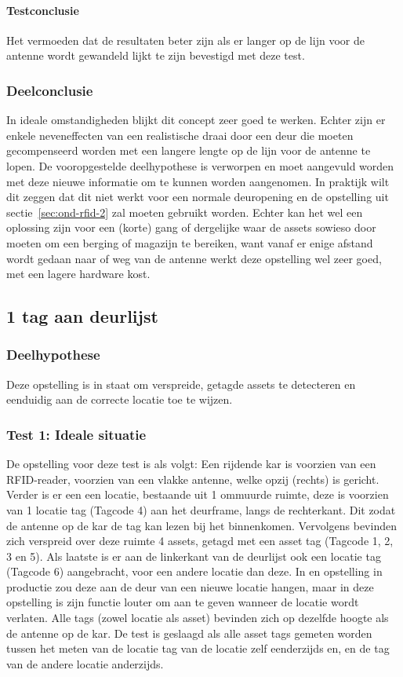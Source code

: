 \paragraph{Testconclusie}
Het vermoeden dat de resultaten beter zijn als er langer op de lijn voor de antenne wordt gewandeld lijkt te zijn bevestigd met deze test.

\subsubsection{Deelconclusie}
In ideale omstandigheden blijkt dit concept zeer goed te werken. Echter zijn er enkele neveneffecten van een realistische draai door een deur die moeten gecompenseerd worden met een langere lengte op de lijn voor de antenne te lopen. De vooropgestelde deelhypothese is verworpen en moet aangevuld worden met deze nieuwe informatie om te kunnen worden aangenomen. In praktijk wilt dit zeggen dat dit niet werkt voor een normale deuropening en de opstelling uit sectie~\ref{sec:ond-rfid-2} zal moeten gebruikt worden. Echter kan het wel een oplossing zijn voor een (korte) gang of dergelijke waar de assets sowieso door moeten om een berging of magazijn te bereiken, want vanaf er enige afstand wordt gedaan naar of weg van de antenne werkt deze opstelling wel zeer goed, met een lagere hardware kost. 

\subsection{1 tag aan deurlijst}
\label{sec:ond-rfid-4}
\subsubsection{Deelhypothese}
Deze opstelling is in staat om verspreide, getagde assets te detecteren en eenduidig aan de correcte locatie toe te wijzen.

\subsubsection{Test 1: Ideale situatie}
\label{sec:ond-rfid-4-1}
De opstelling voor deze test is als volgt: Een rijdende kar is voorzien van een RFID-reader, voorzien van een vlakke antenne, welke opzij (rechts) is gericht. Verder is er een een locatie, bestaande uit 1 ommuurde ruimte, deze is voorzien van 1 locatie tag (Tagcode 4) aan het deurframe, langs de rechterkant. Dit zodat de antenne op de kar de tag kan lezen bij het binnenkomen. Vervolgens bevinden zich verspreid over deze ruimte 4 assets, getagd met een asset tag (Tagcode 1, 2, 3 en 5). Als laatste is er aan de linkerkant van de deurlijst ook een locatie tag (Tagcode 6) aangebracht, voor een andere locatie dan deze. In en opstelling in productie zou deze aan de deur van een nieuwe locatie hangen, maar in deze opstelling is zijn functie louter om aan te geven wanneer de locatie wordt verlaten. Alle tags (zowel locatie als asset) bevinden zich op dezelfde hoogte als de antenne op de kar. De test is geslaagd als alle asset tags gemeten worden tussen het meten van de locatie tag van de locatie zelf eenderzijds en, en de tag van de andere locatie anderzijds.


